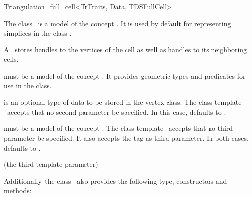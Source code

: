\begin{ccRefClass}{Triangulation_full_cell<TrTraits, Data, TDSFullCell>}

\ccDefinition

The class \ccRefName\ is a model of the concept . It
is used by default for representing simplices in the class
.

A \ccRefName\ stores handles to the vertices of the cell as well as handles
to its neighboring cells.


\ccParameters

 must be a model of the concept . It
provides geometric types and predicates for use in the
 class.

 is an optional type of data to be stored in the vertex class. The
class template \ccRefName\ accepts that no second parameter be specified. In
this case,  defaults to .

 must be a model of the concept .
The class template \ccRefName\ accepts that no third parameter be specified.
It also accepts the tag  as third parameter. In both
cases,  defaults to .

\ccInheritsFrom

 (the third template parameter)

\ccIsModel


Additionally, the class \ccRefName\ also provides the following type,
constructors and methods:

\ccTypes


\ccCreation
{}




\end{ccRefClass}
